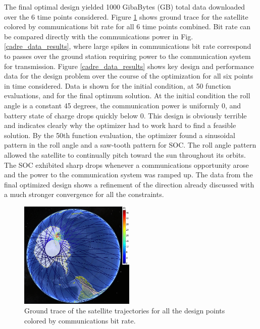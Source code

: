 \documentclass[]{aiaa-tc} %
\begin{document}
        The final optimal design yielded 1000 GibaBytes (GB) total data downloaded over the 6 time points considered. 
        Figure \ref{fig:trajectories} shows ground trace for the satellite colored by communications bit rate
        for all 6 time points combined. Bit rate can be compared directly with the communications power in
        Fig. \ref{cadre_data_results}, where large spikes in communications bit rate correspond to passes over the ground station requiring 
        power to the communication system for transmission. Figure \ref{cadre_data_results} shows key design and performance data 
        for the design problem over the course of the optimization for all six points in time considered. Data is shown for the 
        initial condition, at 50 function evaluations, and for the final optimum solution. At the initial condition
        the roll angle is a constant 45 degrees, the communication power is uniformly 0, and battery state of charge drops quickly below 0. 
        This design is obviously terrible and indicates clearly why the optimizer had to work hard to find a feasible solution. 
        By the 50th function evaluation, the optimizer found a sinusoidal pattern in the roll angle and a saw-tooth pattern 
        for SOC. The roll angle pattern allowed the satellite to continually pitch toward the sun throughout its orbits. 
        The SOC exhibited sharp drops whenever a communications opportunity arose and the power to the communication system was ramped up. 
        The data from the final optimized design shows a refinement of the direction already discussed with a much stronger convergence for 
        all the constraints. 

        \begin{figure}[!htb]
            \centering
            \includegraphics[width=0.49\textwidth]{images/allpts_gearth_mcmurdo}
            \caption{Ground trace of the satellite trajectories 
            for all the design points colored by communications bit rate. 
            \label{fig:trajectories}
            }
        \end{figure}
\end{document}
